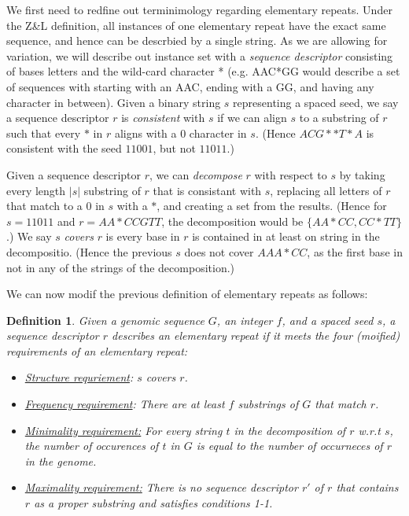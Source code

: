 \documentclass[11pt]{article}
\newtheorem{definition}{Definition}
\begin{document}
We first need to redfine out terminimology regarding elementary
repeats.  Under the Z\&L definition, all instances of one elementary
repeat have the exact same sequence, and hence can be descrbied by a
single string.  As we are allowing for variation, we will describe out
instance set with a {\it sequence descriptor} consisting of bases
letters and the wild-card character * (e.g. AAC*GG would describe a
set of sequences with starting with an AAC, ending with a GG, and
having any character in between).  Given a binary string $s$
representing a spaced seed, we say a sequence descriptor $r$ is
{\it consistent} with $s$ if we can align $s$ to a substring of $r$ such
that every $*$ in $r$ aligns with a $0$ character in $s$. (Hence
$ACG**T*A$ is consistent with the seed $11001$, but not $11011$.) 

Given a sequence descriptor $r$, we can {\it decompose} $r$ with
respect to $s$ by taking every length $|s|$ substring of $r$ that is consistant
with $s$, replacing all letters of $r$ that match to a 0 in $s$ with a
$*$, and creating a set from the results.  (Hence for $s = 11011$ and
$r=AA*CCGTT$, the decomposition would be $\{AA*CC, CC*TT\}$.)  We say
$s$ {\it covers} $r$ is every base in $r$ is contained in at least on
string in the decompositio.  (Hence the previous $s$ does not cover $AAA*CC$, as
the first base in not in any of the strings of the decomposition.)


We can now modif the previous definition of elementary repeats as
follows:
\begin{definition} Given a genomic sequence $G$, an integer $f$, and a
  spaced seed $s$, a sequence descriptor $r$ describes an elementary
  repeat if it meets the four (moified) requirements of an elementary repeat:
\begin{itemize}
\item \underline{Structure requriement}: $s$ covers $r$.
\item \underline{Frequency requirement}: There are at least $f$
  substrings of $G$ that match $r$.
\item \underline{Minimality requirement:} For every string $t$ in the
  decomposition of $r$ w.r.t $s$, the number of occurences of $t$ in
  $G$ is equal to the number of occurneces of $r$ in the genome.
\item \underline{Maximality requirement:} There is no sequence
  descriptor $r'$ of $r$ that contains $r$ as a proper substring and
  satisfies conditions 1-1.
\end{itemize}
\end{definition}
\end{document}
